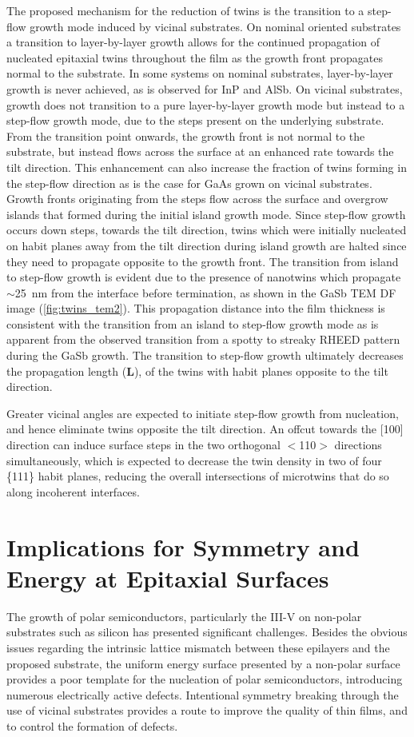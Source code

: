 The proposed mechanism for the reduction of twins is the transition to a step-flow growth mode induced by vicinal substrates.
On nominal oriented substrates a transition to layer-by-layer growth allows for the continued propagation of nucleated epitaxial twins throughout the film as the growth front propagates normal to the substrate.
In some systems on nominal substrates, layer-by-layer growth is never achieved, as is observed for InP and AlSb.
On vicinal substrates, growth does not transition to a pure layer-by-layer growth mode but instead to a step-flow growth mode, due to the steps present on the underlying substrate.
From the transition point onwards, the growth front is not normal to the substrate, but instead flows across the surface at an enhanced rate towards the tilt direction.
This enhancement can also increase the fraction of twins forming in the step-flow direction as is the case for GaAs grown on vicinal substrates.
Growth fronts originating from the steps flow across the surface and overgrow islands that formed during the initial island growth mode.
Since step-flow growth occurs down steps, towards the tilt direction, twins which were initially nucleated on habit planes away from the tilt direction during island growth are halted since they need to propagate opposite to the growth front.
The transition from island to step-flow growth is evident due to the presence of nanotwins which propagate \(\sim\)25~nm from the interface before termination, as shown in the GaSb TEM DF image (\cref{fig:twins_tem2}).
This propagation distance into the film thickness is consistent with the transition from an island to step-flow growth mode as is apparent from the observed transition from a spotty to streaky RHEED pattern during the GaSb growth.
The transition to step-flow growth ultimately decreases the propagation length (\textbf{L}), of the twins with habit planes opposite to the tilt direction.

Greater vicinal angles are expected to initiate step-flow growth from nucleation, and hence eliminate twins opposite the tilt direction.
An offcut towards the [100] direction can induce surface steps in the two orthogonal \(<\)110\(>\) directions simultaneously\cite{Fang1990}, which is expected to decrease the twin density in two of four \{111\} habit planes, reducing the overall intersections of microtwins that do so along incoherent interfaces.
\section{Implications for Symmetry and Energy at Epitaxial Surfaces}
The growth of polar semiconductors, particularly the III-V on non-polar substrates such as silicon has presented significant challenges.
Besides the obvious issues regarding the intrinsic lattice mismatch between these epilayers and the proposed substrate, the uniform energy surface presented by a non-polar surface provides a poor template for the nucleation of polar semiconductors, introducing numerous electrically active defects.
Intentional symmetry breaking through the use of vicinal substrates provides a route to improve the quality of thin films, and to control the formation of defects.


